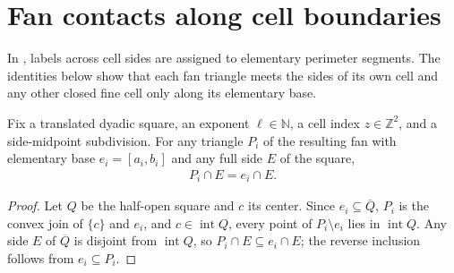 \section{Fan contacts along cell boundaries}
\label{sec:area_law_fan_side_contacts}

In \cite[Section~11]{OpenAI2026AreaLaw}, labels across cell sides are
assigned to elementary perimeter segments. The identities below show that
each fan triangle meets the sides of its own cell and any other closed
fine cell only along its elementary base.


\begin{lemma}
    \label{thm:area_law_fan_own_side_contact}
    \leanok
    Fix a translated dyadic square, an exponent $\ell\in\mathbb N$,
    a cell index $z\in\mathbb Z^2$, and a side-midpoint subdivision.
    For any triangle $P_i$ of the resulting fan with elementary base
    $e_i=[a_i,b_i]$ and any full side $E$ of the square,
    \begin{align}
        P_i\cap E=e_i\cap E.
    \end{align}
\end{lemma}
\begin{proof}\leanok
    Let $Q$ be the half-open square and $c$ its center.
    Since $e_i\subseteq\overline Q$, $P_i$ is the convex join of $\{c\}$ and
    $e_i$, and $c\in\operatorname{int}Q$, every point of $P_i\setminus e_i$
    lies in $\operatorname{int}Q$. Any side $E$ of $\overline Q$ is disjoint
    from $\operatorname{int}Q$, so $P_i\cap E\subseteq e_i\cap E$; the reverse
    inclusion follows from $e_i\subseteq P_i$.
\end{proof}

